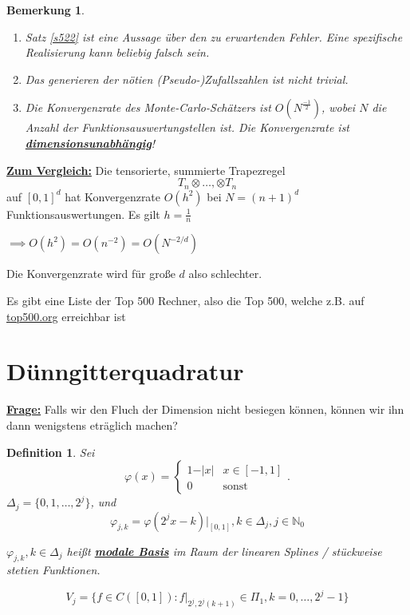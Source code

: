 \documentclass{book}
\newtheorem{definition}[algorithm]{Definition}
\newtheorem{remark}[algorithm]{Bemerkung}
\def\N{\mathbb{N}}
\begin{document}
            \begin{remark}\label{b523}
                \begin{enumerate}
                    \item Satz \ref{s522} ist eine Aussage über den zu erwartenden Fehler. Eine spezifische Realisierung kann beliebig falsch sein.
                    \item Das generieren der nötien (Pseudo-)Zufallszahlen ist nicht trivial.
                    \item Die Konvergenzrate des Monte-Carlo-Schätzers ist $O(N^{\frac{-1}{2}})$, wobei $N$ die Anzahl der Funktionsauswertungstellen ist. 
                          Die Konvergenzrate ist \underline{\textbf{dimensionsunabhängig}}!
                \end{enumerate}
            \end{remark}

            \underline{\textbf{Zum Vergleich:}} Die tensorierte, summierte Trapezregel 
            \[T_n\otimes\dots,\otimes T_n\] 
            auf $[0,1]^d$ hat Konvergenzrate $O(h^2)$ bei $N=(n+1)^d$ Funktionsauswertungen. Es gilt $h=\frac{1}{n}$

            $\implies O(h^2)=O(n^{-2})=O(N^{-2/d})$

            Die Konvergenzrate wird für große $d$ also schlechter.

            \begin{tcolorbox}[enhanced,breakable,
            title=Top 500]
            Es gibt eine Liste der Top 500 Rechner, also die Top 500, welche z.B. auf \href{top500.org}{top500.org} erreichbar ist
            \end{tcolorbox}

        \section{Dünngitterquadratur}

            \underline{\textbf{Frage:}} Falls wir den Fluch der Dimension nicht besiegen können, können wir ihn dann wenigstens eträglich machen?
            
            \begin{definition}\label{d524}
                Sei 
                \[\varphi(x)=\begin{cases}1-\vert x\vert & x\in[-1,1]\\ 0 & \text{sonst}\end{cases}.\]
                    $\Delta_j=\{0,1,\dots,2^j\}$, und 
                \[\varphi_{j,k}=\varphi(2^j x-k)\vert_{[0,1]},k\in\Delta_j,j\in \N_0\]

                $\varphi_{j,k},k\in\Delta_j$ heißt \underline{\textbf{modale Basis}} im Raum der linearen Splines / stückweise stetien Funktionen. 

                \[V_j=\{f\in C([0,1]):f\vert_{2^j,2^j(k+1)}\in \Pi_1,k=0,\dots,2^j-1\}\]

            \end{definition}
\end{document}
